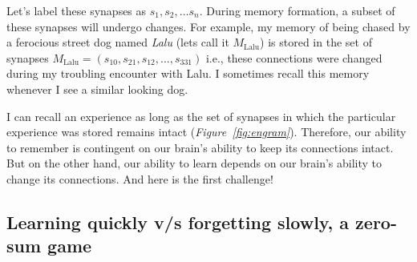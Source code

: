 \documentclass[]{resonance}
\newcommand\Fig[1]{\textit{Figure~\ref{#1}}}
\begin{document}
Let's label these synapses as $s_1, s_2, \ldots s_n$. During memory formation, a
subset of these synapses will undergo changes. For example, my memory of being
chased by a ferocious street dog named \emph{Lalu} (lets call it
$M_\text{Lalu}$) is stored in the set of synapses $M_\text{Lalu}=(s_{10},
s_{21}, s_{12},\ldots,s_{331})$ i.e., these connections were changed during my
troubling encounter with Lalu. I sometimes recall this memory whenever I see a
similar looking dog.

I can recall an experience as long as the set of synapses in which the
particular experience was stored remains intact (\Fig{fig:engram}). Therefore,
our ability to remember is contingent on our brain's ability to keep its
connections intact.  But on the other hand, our ability to learn depends on our
brain's ability to change its connections. And here is the first challenge!

\subsection{Learning quickly v/s forgetting slowly, a zero-sum game}\label{subsec:zero_sum} 
\end{document}
